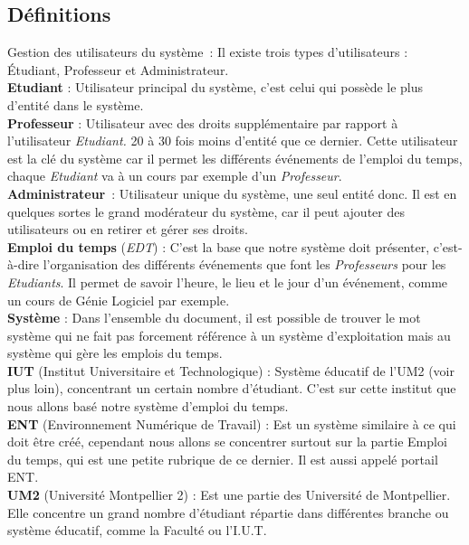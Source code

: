 \documentclass[a4paper, 11pt]{article}
\begin{document}
        \subsection{ Définitions}
        Gestion des utilisateurs du système~: Il existe trois types d'utilisateurs : Étudiant, Professeur et Administrateur.
        \\\textbf{Etudiant} : Utilisateur principal du système, c'est celui qui possède le plus d'entité dans le système.
        \\\textbf{Professeur} : Utilisateur avec des droits supplémentaire par rapport à l'utilisateur \textit{Etudiant. }20 à 30 fois moins d'entité que ce dernier. Cette utilisateur est la clé du système car il permet les différents événements de l'emploi du temps, chaque \textit{Etudiant} va à un cours par exemple d'un \textit{Professeur}.
        \\\textbf{Administrateur}~: Utilisateur unique du système, une seul entité donc. Il est en quelques sortes le grand modérateur du système, car il peut ajouter des utilisateurs ou en retirer et gérer ses droits.
        \\\textbf{Emploi du temps} (\textit{EDT}) : C'est la base que notre système doit présenter, c'est-à-dire l'organisation des différents événements que font les \textit{Professeurs} pour les \textit{Etudiants}. Il permet de savoir l'heure, le lieu et le jour d'un événement, comme un cours de Génie Logiciel par exemple.
        \\\textbf{Système} : Dans l'ensemble du document, il est possible de trouver le mot système qui ne fait pas forcement référence à un système d'exploitation mais au système qui gère les emplois du temps.
        \\\textbf{IUT} (Institut Universitaire et Technologique) : Système éducatif de l'UM2 (voir plus loin), concentrant un certain nombre d'étudiant. C'est sur cette institut que nous allons basé notre système d'emploi du temps.
        \\\textbf{ENT} (Environnement Numérique de Travail) : Est un système similaire à ce qui doit être créé, cependant nous allons se concentrer surtout sur la partie Emploi du temps, qui est une petite rubrique de ce dernier. Il est aussi appelé portail ENT.
        \\\textbf{UM2} (Université Montpellier 2) : Est une partie des Université de Montpellier. Elle concentre un grand nombre d'étudiant répartie dans différentes branche ou système éducatif, comme la Faculté ou l'I.U.T. 
\end{document}
